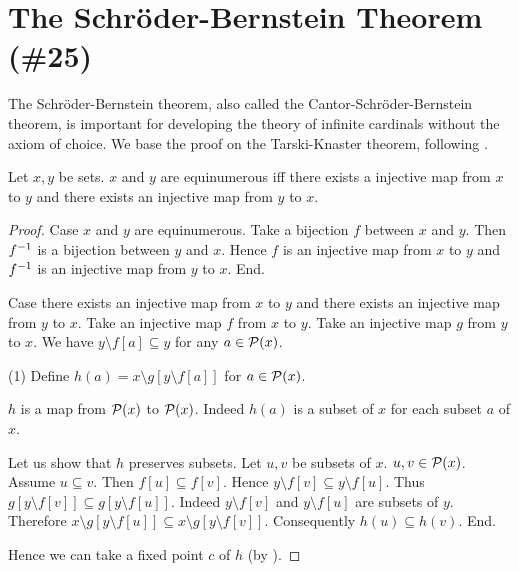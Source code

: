 \documentclass{article}
\begin{document}
\section{The Schröder-Bernstein Theorem (\#25)}

The Schröder-Bernstein theorem, also called the
Cantor-Schröder-Bernstein theorem, is important for developing
the theory of infinite cardinals without the axiom of choice.
We base the proof on the Tarski-Knaster theorem, following
 \cite[p. 530]{Schroeder2012}.

 \begin{forthel}

   \begin{theorem*}\label{CSB}
      Let $x,y$ be sets.
      $x$ and $y$ are equinumerous iff there exists a injective map from $x$ to
      $y$ and there exists an injective map from $y$ to $x$.
    \end{theorem*}
    \begin{proof}
      Case $x$ and $y$ are equinumerous.
        Take a bijection $f$ between $x$ and $y$.
        Then $f^{-1}$ is a bijection between $y$ and $x$.
        Hence $f$ is an injective map from $x$ to $y$ and $f^{-1}$ is an
        injective map from $y$ to $x$.
      End.

      Case there exists an injective map from $x$ to $y$ and there exists an
      injective map from $y$ to $x$.
        Take an injective map $f$ from $x$ to $y$.
        Take an injective map $g$ from $y$ to $x$.
        We have $y \setminus f[a] \subseteq y$ for any $a \in {\cal P}(x)$.

        (1) Define $h(a) = x \setminus g[y \setminus f[a]]$ for $a \in {\cal P}(x)$.

        $h$ is a map from ${\cal P}(x)$ to ${\cal P}(x)$.
        Indeed $h(a)$ is a subset of $x$ for each subset $a$ of $x$.

        Let us show that $h$ preserves subsets.
          Let $u, v$ be subsets of $x$. $u,v \in {\cal P}(x)$.
          Assume $u \subseteq v$.
          Then $f[u] \subseteq f[v]$.
          Hence $y \setminus f[v] \subseteq y \setminus f[u]$.
          Thus $g[y \setminus f[v]] \subseteq g[y \setminus f[u]]$.
          Indeed $y \setminus f[v]$ and $y \setminus f[u]$ are subsets of $y$.
          Therefore $x \setminus g[y \setminus f[u]] \subseteq
          x \setminus g[y \setminus f[v]]$.
          Consequently $h(u) \subseteq h(v)$. 
        End.

        Hence we can take a fixed point $c$ of $h$ (by ).


\end{proof}
\end{forthel}
\end{document}
